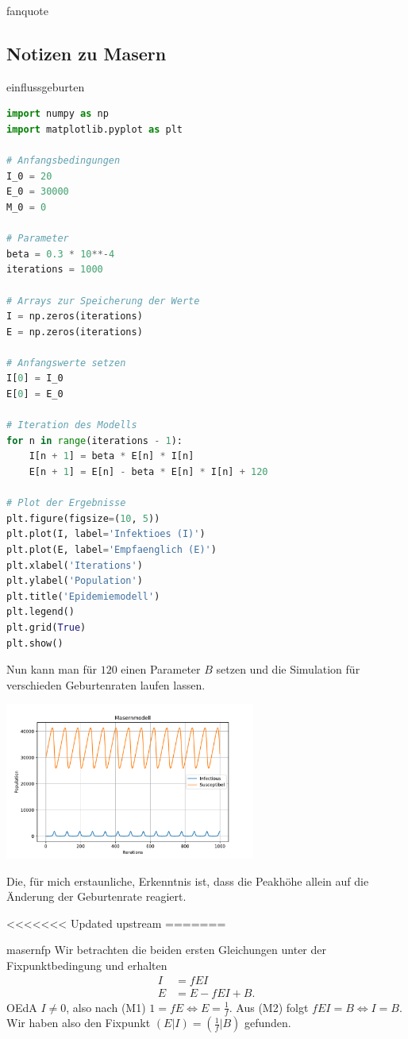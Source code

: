 \documentclass[%
<<<<<<< Updated upstream
<<<<<<< Updated upstream
11pt,%
twoside,%
titlepage,%
german,%
headsepline%
]{scrartcl}
\begin{document}
\begin{uebenv}{fanquote}
\clearpage

\subsection{Notizen zu Masern}

\begin{lsg}{einflussgeburten}
    \begin{lstlisting}[language=python]
import numpy as np
import matplotlib.pyplot as plt

# Anfangsbedingungen
I_0 = 20
E_0 = 30000
M_0 = 0

# Parameter
beta = 0.3 * 10**-4
iterations = 1000

# Arrays zur Speicherung der Werte
I = np.zeros(iterations)
E = np.zeros(iterations)

# Anfangswerte setzen
I[0] = I_0
E[0] = E_0

# Iteration des Modells
for n in range(iterations - 1):
    I[n + 1] = beta * E[n] * I[n]
    E[n + 1] = E[n] - beta * E[n] * I[n] + 120

# Plot der Ergebnisse
plt.figure(figsize=(10, 5))
plt.plot(I, label='Infektioes (I)')
plt.plot(E, label='Empfaenglich (E)')
plt.xlabel('Iterations')
plt.ylabel('Population')
plt.title('Epidemiemodell')
plt.legend()
plt.grid(True)
plt.show()
\end{lstlisting}

Nun kann man für $120$ einen Parameter $B$ setzen und die Simulation für verschieden Geburtenraten laufen lassen.
    
\begin{center}	
\includegraphics[width=0.618\textwidth]{pictures/masernmodellpdf}
\end{center}

    Die, für mich erstaunliche, Erkenntnis ist, dass die Peakhöhe allein auf die Änderung der Geburtenrate reagiert.
\end{lsg}

<<<<<<< Updated upstream
=======
\begin{lsg}{masernfp}
	Wir betrachten die beiden ersten Gleichungen unter der Fixpunktbedingung und erhalten
	\begin{align}
		I &= fEI\tag{M1}\\
		E &= E-fEI+B\tag{M2}.
	\end{align}
	OEdA $I\neq0$, also nach (M1) $1=fE \Leftrightarrow E=\frac{1}{f}$. Aus (M2) folgt $fEI=B \Leftrightarrow I=B$. Wir haben also den Fixpunkt $(E|I)=(\frac{1}{f}|B)$ gefunden.
\end{lsg}


\end{uebenv}
\end{document}
